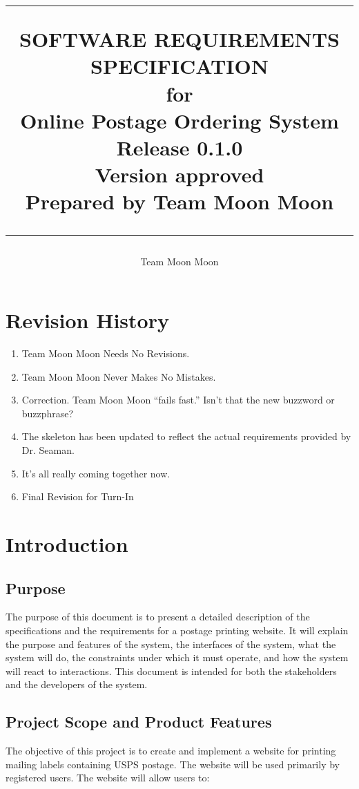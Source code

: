 \documentclass{scrreprt}
\title{%
\flushright
\rule{16cm}{5pt}\vskip1cm
\Huge{SOFTWARE REQUIREMENTS\\ SPECIFICATION}\\
\vspace{2cm}
for\\
\vspace{2cm}
Online Postage Ordering System\\
\vspace{2cm}
\LARGE{Release 0.1.0\\}
\vspace{2cm}
\LARGE{Version \myversion approved\\}
\vspace{2cm}
Prepared by Team Moon Moon\\
\vfill
\rule{16cm}{5pt}
}
\date{}
\author{Team Moon Moon}
\begin{document}
\maketitle
\tableofcontents

\chapter*{Revision History}

\begin{enumerate}
\item Team Moon Moon Needs No Revisions.
\item Team Moon Moon Never Makes No Mistakes.
\item Correction. Team Moon Moon ``fails fast.'' Isn't that the new 
buzzword or buzzphrase?
\item The skeleton has been updated to reflect the actual requirements 
provided by Dr. Seaman.
\item It's all really coming together now.
\item Final Revision for Turn-In
\end{enumerate}

\chapter{Introduction}

\section{Purpose}

The purpose of this document is to present a detailed description of the
speciﬁcations and the requirements for a postage printing website. It will
explain the purpose and features of the system, the interfaces of the system,
what the system will do, the constraints under which it must operate, and how
the system will react to interactions. This document is intended for both the
stakeholders and the developers of the system.

\section{Project Scope and Product Features}

The objective of this project is to create and implement a website for printing
mailing labels containing USPS postage. The website will be used primarily by
registered users. The website will allow users to: 
\end{document}
